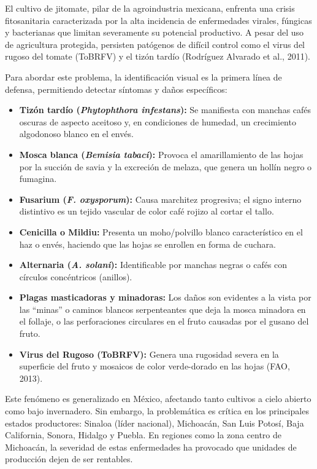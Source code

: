 

El cultivo de jitomate, pilar de la agroindustria mexicana, enfrenta una crisis fitosanitaria caracterizada por la alta incidencia de enfermedades virales, fúngicas y bacterianas que limitan severamente su potencial productivo. A pesar del uso de agricultura protegida, persisten patógenos de difícil control como el virus del rugoso del tomate (ToBRFV) y el tizón tardío (Rodríguez Alvarado et al., 2011).

Para abordar este problema, la identificación visual es la primera línea de defensa, permitiendo detectar síntomas y daños específicos:

\begin{itemize}
    \item \textbf{Tizón tardío (\textit{Phytophthora infestans}):} Se manifiesta con manchas cafés oscuras de aspecto aceitoso y, en condiciones de humedad, un crecimiento algodonoso blanco en el envés.
    \item \textbf{Mosca blanca (\textit{Bemisia tabaci}):} Provoca el amarillamiento de las hojas por la succión de savia y la excreción de melaza, que genera un hollín negro o fumagina.
    \item \textbf{Fusarium (\textit{F. oxysporum}):} Causa marchitez progresiva; el signo interno distintivo es un tejido vascular de color café rojizo al cortar el tallo.
    \item \textbf{Cenicilla o Mildiu:} Presenta un moho/polvillo blanco característico en el haz o envés, haciendo que las hojas se enrollen en forma de cuchara.
    \item \textbf{Alternaria (\textit{A. solani}):} Identificable por manchas negras o cafés con círculos concéntricos (anillos).
    \item \textbf{Plagas masticadoras y minadoras:} Los daños son evidentes a la vista por las ``minas'' o caminos blancos serpenteantes que deja la mosca minadora en el follaje, o las perforaciones circulares en el fruto causadas por el gusano del fruto.
    \item \textbf{Virus del Rugoso (ToBRFV):} Genera una rugosidad severa en la superficie del fruto y mosaicos de color verde-dorado en las hojas (FAO, 2013).
\end{itemize}

Este fenómeno es generalizado en México, afectando tanto cultivos a cielo abierto como bajo invernadero. Sin embargo, la problemática es crítica en los principales estados productores: Sinaloa (líder nacional), Michoacán, San Luis Potosí, Baja California, Sonora, Hidalgo y Puebla. En regiones como la zona centro de Michoacán, la severidad de estas enfermedades ha provocado que unidades de producción dejen de ser rentables.


